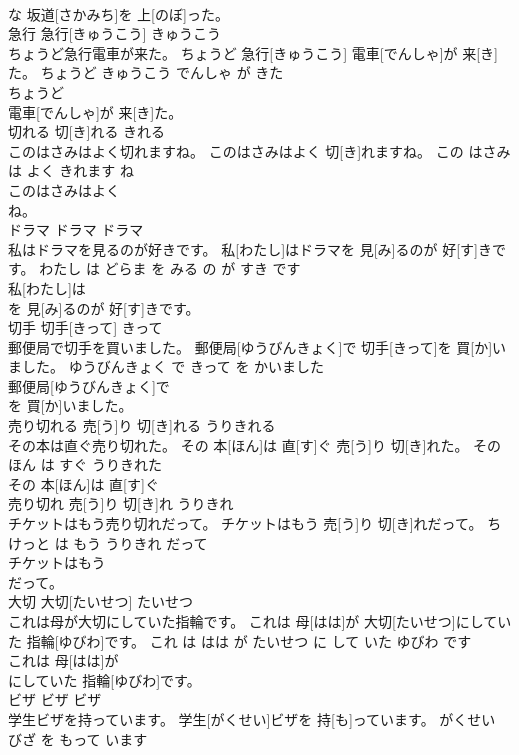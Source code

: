 \documentclass[8pt]{extreport}
\begin{document}
\begin{CJK}{UTF8}{min}
\\	な 坂道[さかみち]を 上[のぼ]った。		
\\	急行	急行[きゅうこう]	きゅうこう	
\\	ちょうど急行電車が来た。	ちょうど 急行[きゅうこう] 電車[でんしゃ]が 来[き]た。	ちょうど きゅうこう でんしゃ が きた	
\\	ちょうど
\\	電車[でんしゃ]が 来[き]た。		
\\	切れる	切[き]れる	きれる	
\\	このはさみはよく切れますね。	このはさみはよく 切[き]れますね。	この はさみ は よく きれます ね	
\\	このはさみはよく
\\	ね。		
\\	ドラマ	ドラマ	ドラマ	
\\	私はドラマを見るのが好きです。	私[わたし]はドラマを 見[み]るのが 好[す]きです。	わたし は どらま を みる の が すき です	
\\	私[わたし]は
\\	を 見[み]るのが 好[す]きです。		
\\	切手	切手[きって]	きって	
\\	郵便局で切手を買いました。	郵便局[ゆうびんきょく]で 切手[きって]を 買[か]いました。	ゆうびんきょく で きって を かいました	
\\	郵便局[ゆうびんきょく]で
\\	を 買[か]いました。		
\\	売り切れる	売[う]り 切[き]れる	うりきれる	
\\	その本は直ぐ売り切れた。	その 本[ほん]は 直[す]ぐ 売[う]り 切[き]れた。	その ほん は すぐ うりきれた	
\\	その 本[ほん]は 直[す]ぐ
\\	売り切れ	売[う]り 切[き]れ	うりきれ	
\\	チケットはもう売り切れだって。	チケットはもう 売[う]り 切[き]れだって。	ちけっと は もう うりきれ だって	
\\	チケットはもう
\\	だって。		
\\	大切	大切[たいせつ]	たいせつ	
\\	これは母が大切にしていた指輪です。	これは 母[はは]が 大切[たいせつ]にしていた 指輪[ゆびわ]です。	これ は はは が たいせつ に して いた ゆびわ です	
\\	これは 母[はは]が
\\	にしていた 指輪[ゆびわ]です。		
\\	ビザ	ビザ	ビザ	
\\	学生ビザを持っています。	学生[がくせい]ビザを 持[も]っています。	がくせい びざ を もって います	

\end{CJK}
\end{document}
